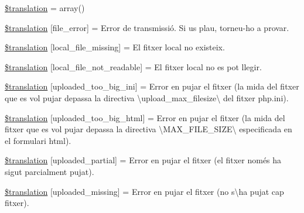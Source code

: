 \begin{DoxyCompactItemize}
\item 
\hyperlink{class_8upload_8ca___c_a_8php_a1f198d410fecc3871ebdd468d343a5e3}{\$translation} = array()
\item 
\hyperlink{class_8upload_8ca___c_a_8php_ac7498e49b9771b04698029aa61c70821}{\$translation} \mbox{[}\textquotesingle{}file\+\_\+error\textquotesingle{}\mbox{]} = \textquotesingle{}Error de transmissió. Si us plau, torneu-\/ho a provar.\textquotesingle{}
\item 
\hyperlink{class_8upload_8ca___c_a_8php_a6ec3d3a47ab70d77e7aa593e82ead10e}{\$translation} \mbox{[}\textquotesingle{}local\+\_\+file\+\_\+missing\textquotesingle{}\mbox{]} = \textquotesingle{}El fitxer local no existeix.\textquotesingle{}
\item 
\hyperlink{class_8upload_8ca___c_a_8php_a60104befef9b241f3a7a6a755618a4b3}{\$translation} \mbox{[}\textquotesingle{}local\+\_\+file\+\_\+not\+\_\+readable\textquotesingle{}\mbox{]} = \textquotesingle{}El fitxer local no es pot llegir.\textquotesingle{}
\item 
\hyperlink{class_8upload_8ca___c_a_8php_a6a08dcd0d3651fdd098568f6b2f0a42c}{\$translation} \mbox{[}\textquotesingle{}uploaded\+\_\+too\+\_\+big\+\_\+ini\textquotesingle{}\mbox{]} = \textquotesingle{}Error en pujar el fitxer (la mida del fitxer que es vol pujar depassa la directiva \textbackslash{}\textquotesingle{}upload\+\_\+max\+\_\+filesize\textbackslash{}\textquotesingle{} del fitxer php.\+ini).\textquotesingle{}
\item 
\hyperlink{class_8upload_8ca___c_a_8php_a623d5b8b92169f57d7e43458aa911cbb}{\$translation} \mbox{[}\textquotesingle{}uploaded\+\_\+too\+\_\+big\+\_\+html\textquotesingle{}\mbox{]} = \textquotesingle{}Error en pujar el fitxer (la mida del fitxer que es vol pujar depassa la directiva \textbackslash{}\textquotesingle{}M\+A\+X\+\_\+\+F\+I\+L\+E\+\_\+\+S\+I\+Z\+E\textbackslash{}\textquotesingle{} especificada en el formulari html).\textquotesingle{}
\item 
\hyperlink{class_8upload_8ca___c_a_8php_a967c17da21b0a2d3bd65cca3a9ca0ea8}{\$translation} \mbox{[}\textquotesingle{}uploaded\+\_\+partial\textquotesingle{}\mbox{]} = \textquotesingle{}Error en pujar el fitxer (el fitxer només ha sigut parcialment pujat).\textquotesingle{}
\item 
\hyperlink{class_8upload_8ca___c_a_8php_a0cce433260be65f1f35853a6b4b8952b}{\$translation} \mbox{[}\textquotesingle{}uploaded\+\_\+missing\textquotesingle{}\mbox{]} = \textquotesingle{}Error en pujar el fitxer (no s\textbackslash{}\textquotesingle{}ha pujat cap fitxer).\textquotesingle{}

\end{DoxyCompactItemize}
